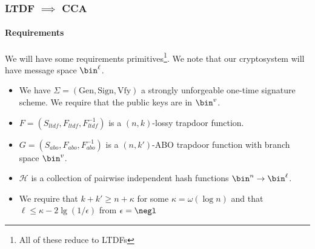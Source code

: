 \documentclass{beamer}
\begin{document}
\begin{frame}
    \frametitle{LTDF $\implies$ CCA}
    \framesubtitle{Requirements}
    We will have some requirements primitives\footnote{All of these reduce to LTDFs}.
    We note that our cryptosystem will have message space $\bin^\ell$.
    \begin{itemize}
        \item We have $\Sigma = (\mathrm{Gen}, \mathrm{Sign}, \mathrm{Vfy})$ a strongly unforgeable one-time signature scheme. We require that the public keys are in $\bin^v$.
        \item $F = (S_{ltdf}, F_{ltdf}, F^{-1}_{ltdf})$ is a $(n, k)$-lossy trapdoor function.
        \item $G = (S_{abo}, F_{abo}, F^{-1}_{abo})$ is a $(n, k')$-ABO trapdoor function with branch space $\bin^v$.
        \item $\mathcal{H}$ is a collection of pairwise independent hash functions $\bin^n \to \bin^\ell$.
        \item We require that $k + k' \geq n + \kappa$ for some $\kappa = \omega(\log n)$ and that $\ell \leq \kappa - 2 \lg(1/\epsilon)$ from $\epsilon = \negl$
    \end{itemize}
\end{frame}
\end{document}
